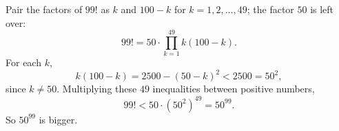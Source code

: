 Pair the factors of $99!$ as $k$ and $100-k$ for $k=1,2,\dots,49$; the factor $50$ is left over:
\[99!=50\cdot\prod_{k=1}^{49}k(100-k).\]
For each $k$,
\[k(100-k)=2500-(50-k)^2<2500=50^2,\]
since $k\ne50$. Multiplying these $49$ inequalities between positive numbers,
\[99!<50\cdot\left(50^2\right)^{49}=50^{99}.\]
So $\boxed{50^{99}}$ is bigger.
